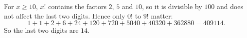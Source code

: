 For $x\ge10$, $x!$ contains the factors $2$, $5$ and $10$, so it is divisible by $100$ and does not affect the last two digits. Hence only $0!$ to $9!$ matter:
\[
1+1+2+6+24+120+720+5040+40320+362880=409114 .
\]
So the last two digits are $\boxed{14}$.
